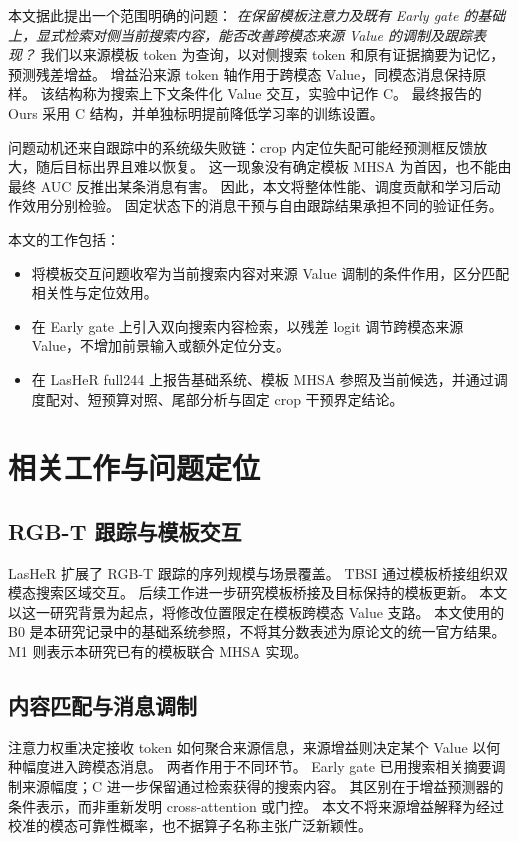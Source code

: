\documentclass[journal]{IEEEtran}
\begin{document}
本文据此提出一个范围明确的问题：
\emph{在保留模板注意力及既有 Early gate 的基础上，显式检索对侧当前搜索内容，能否改善跨模态来源 Value 的调制及跟踪表现？}
我们以来源模板 token 为查询，以对侧搜索 token 和原有证据摘要为记忆，预测残差增益。
增益沿来源 token 轴作用于跨模态 Value，同模态消息保持原样。
该结构称为搜索上下文条件化 Value 交互，实验中记作 C。
最终报告的 Ours 采用 C 结构，并单独标明提前降低学习率的训练设置。

问题动机还来自跟踪中的系统级失败链：crop 内定位失配可能经预测框反馈放大，随后目标出界且难以恢复。
这一现象没有确定模板 MHSA 为首因，也不能由最终 AUC 反推出某条消息有害。
因此，本文将整体性能、调度贡献和学习后动作效用分别检验。
固定状态下的消息干预与自由跟踪结果承担不同的验证任务。

本文的工作包括：
\begin{itemize}
  \item 将模板交互问题收窄为当前搜索内容对来源 Value 调制的条件作用，区分匹配相关性与定位效用。
  \item 在 Early gate 上引入双向搜索内容检索，以残差 logit 调节跨模态来源 Value，不增加前景输入或额外定位分支。
  \item 在 LasHeR full244 上报告基础系统、模板 MHSA 参照及当前候选，并通过调度配对、短预算对照、尾部分析与固定 crop 干预界定结论。
\end{itemize}

\section{相关工作与问题定位}
\subsection{RGB-T 跟踪与模板交互}
LasHeR 扩展了 RGB-T 跟踪的序列规模与场景覆盖\cite{li2022lasher}。
TBSI 通过模板桥接组织双模态搜索区域交互\cite{hui2023tbsi}。
后续工作进一步研究模板桥接及目标保持的模板更新\cite{li2025tbsi}。
本文以这一研究背景为起点，将修改位置限定在模板跨模态 Value 支路。
本文使用的 B0 是本研究记录中的基础系统参照，不将其分数表述为原论文的统一官方结果。
M1 则表示本研究已有的模板联合 MHSA 实现。

\subsection{内容匹配与消息调制}
注意力权重决定接收 token 如何聚合来源信息，来源增益则决定某个 Value 以何种幅度进入跨模态消息。
两者作用于不同环节。
Early gate 已用搜索相关摘要调制来源幅度；C 进一步保留通过检索获得的搜索内容。
其区别在于增益预测器的条件表示，而非重新发明 cross-attention 或门控。
本文不将来源增益解释为经过校准的模态可靠性概率，也不据算子名称主张广泛新颖性。
\end{document}
